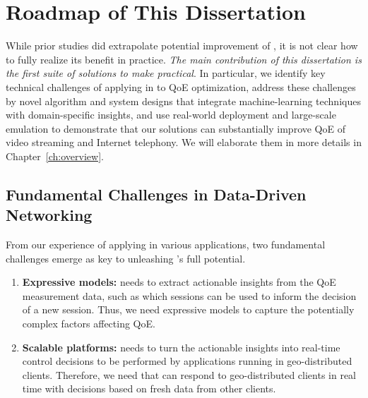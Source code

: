 \section{Roadmap of This Dissertation}

While prior studies did extrapolate potential improvement of \ddn, it is not 
clear how to fully realize its benefit in practice.
{\em The main contribution of this dissertation is the first suite of solutions 
to make \ddn practical}. In particular, 
we identify key technical challenges of applying \ddn in to QoE optimization, 
address these challenges by novel algorithm and system designs that 
integrate machine-learning techniques with domain-specific  insights,
and use real-world deployment and large-scale 
emulation to demonstrate that our solutions can substantially improve 
QoE of video streaming and Internet telephony.
We will elaborate them in more details in Chapter~\ref{ch:overview}.

\subsection{Fundamental Challenges in Data-Driven Networking}
From our experience of applying \ddn in various applications, 
two fundamental challenges emerge as key to unleashing \ddn's full potential.

\begin{enumerate}

\item 
{\bf Expressive models:} \ddn needs to extract actionable insights from the QoE measurement data, 
such as which sessions can be used to inform the decision of a new session.
Thus, we need expressive models to capture the potentially complex 
factors affecting QoE. 

\item 
{\bf Scalable platforms:}
\ddn needs to turn the actionable insights into 
real-time control decisions to be performed by applications running in
geo-distributed clients. 
Therefore, we need that can respond to geo-distributed 
clients in real time with decisions based on fresh data from other clients.

\end{enumerate}

